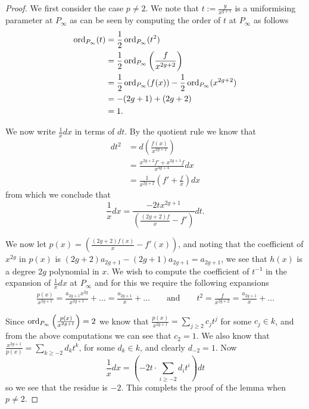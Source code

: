 \begin{proof}

We first consider the case $p\neq 2$.
We note that $t:= \frac{y}{x^{g+1}}$ is a uniformising parameter at $P_\infty$ as can be seen by computing the order of $t$ at $P_\infty$ as follows
\begin{align}
\operatorname{ord}_{P_\infty}(t) & =  \frac{1}{2}\operatorname{ord}_{P_\infty}(t^2) \\
  & =  \frac{1}{2}\operatorname{ord}_{P_\infty}\left( \frac{f}{x^{2g+2}} \right) \\
& =  \frac{1}{2}\operatorname{ord}_{P_\infty}(f(x)) - \frac{1}{2}\operatorname{ord}_{P_\infty}(x^{2g+2})\\
& =  -(2g+1) + (2g+2) \\
& =  1.
\end{align}

We now write $\frac{1}{x}dx$ in terms of $dt$.
By the quotient rule we know that
\begin{align*}
dt^2 & =  d \left( \frac{f(x)}{x^{2g+2}} \right) \\
& =  \frac{x^{2g+2}f' + x^{2g+1}f}{x^{4g+4}} dx \\
& =  \frac{1}{x^{2g+2}} \left( f' + \frac{f}{x} \right) dx
\end{align*}
from which we conclude that
\[
\frac{1}{x}dx = \frac{-2tx^{2g+1}}{\left(\frac{(2g+2)f}{x} - f'\right)} dt.
\]


We now let $p(x) = \left(\frac{(2g+2)f(x)}{x} - f'(x)\right)$, and noting that the coefficient of $x^{2g}$ in $p(x)$ is $(2g+2)a_{2g+1} - (2g+1)a_{2g+1} = a_{2g+1}$, we see that $h(x)$ is a degree $2g$ polynomial in $x$.
We wish to compute the coefficient of $t^{-1}$ in the expansion of $\frac{1}{x}dx$ at $P_\infty$ and for this we require the following expansions
\begin{align}
\frac{p(x)}{x^{2g+1}} = \frac{a_{2g+1}x^{2g}}{x^{2g+1}} + \ldots = \frac{a_{2g+1}}{x} + \ldots \qquad \text{and} \qquad t^2 = \frac{f}{x^{2g+2} } = \frac{a_{2g+1}}{x} + \ldots
\end{align}

Since $\operatorname{ord}_{P_\infty}\left(\frac{p(x)}{x^{2g+1}}\right) = 2$ we know that $\frac{p(x)}{x^{2g+1}} = \sum_{j\geq 2} c_j t^j$ for some $c_j\in k$, and from the above computations we can see that $c_2 = 1$.
We also know that $\frac{x^{2g+1}}{p(x)} = \sum_{k\geq -2} d_kt^k$, for some $d_k\in k$, and clearly $d_{-2} = 1$.
Now
\[
\frac{1}{x}dx = \left( -2t \cdot \sum_{i\geq -2} d_it^i\right) dt 
\]
so we see that the residue is $-2$.
This complets the proof of the lemma when $p\neq 2$.


\end{proof}
